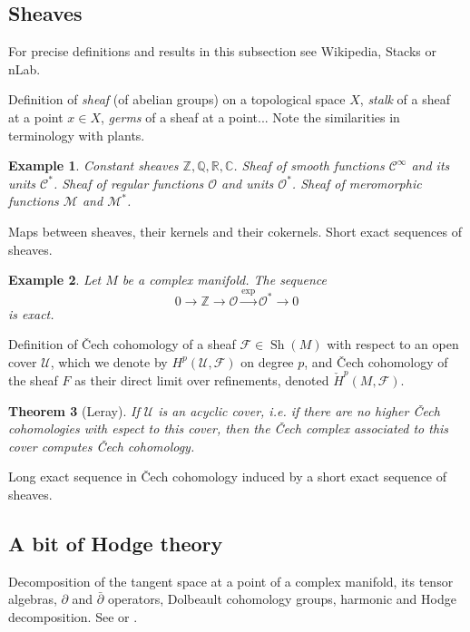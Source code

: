 \documentclass[12pt]{article}
\theoremstyle{darkgreentheorem}
\newtheorem{thm}{Theorem}[section]
\theoremstyle{darkbluedefinition}
\theoremstyle{darkredexample}
\newtheorem{exa}[thm]{Example}
\theoremstyle{remark}
\newcommand{\Z}{\mathbb{Z}}
\newcommand{\Q}{\mathbb{Q}}
\newcommand{\R}{\mathbb{R}}
\newcommand{\1}{\mathbbm{1}}
\newcommand{\C}{\mathbb{C}}
\newcommand{\calC}{\mathcal{C}}
\newcommand{\F}{\mathcal{F}}
\newcommand{\M}{\mathcal{M}}
\renewcommand{\O}{\mathcal{O}}
\newcommand{\U}{\mathcal{U}}
\DeclareMathOperator{\Sh}{Sh}
\begin{document}
\subsection{Sheaves}

For precise definitions and results in this subsection see Wikipedia, Stacks or nLab.

Definition of \textit{sheaf} (of abelian groups) on a topological space $X$, \textit{stalk} of a sheaf at a point $x\in X$, \textit{germs} of a sheaf at a point... Note the similarities in terminology with plants.

\begin{exa}
    Constant sheaves $\Z,\Q,\R,\C$.
    Sheaf of smooth functions $\calC^{\infty}$ and its units $\calC^{*}$.
    Sheaf of regular functions $\O$ and units $\O^{*}$.
    Sheaf of meromorphic functions $\M$ and $\M^{*}$.
\end{exa}

Maps between sheaves, their kernels and their cokernels.
Short exact sequences of sheaves.

\begin{exa}
    Let $M$ be a complex manifold.
    The sequence
    \[ 0\to \Z\to \O\xrightarrow{\exp} \O^{*}\to 0 \]
    is exact.
\end{exa}

Definition of \v{C}ech cohomology of a sheaf $\F\in \Sh(M)$ with respect to an open cover $\U$, which we denote by $H^{p}(\U,\F)$ on degree $p$, and \v{C}ech cohomology of the sheaf $F$ as their direct limit over refinements, denoted $\check{H}^{p}(M,\F)$.

\begin{thm}[Leray]
    If $\U$ is an acyclic cover, i.e. if there are no higher \v{C}ech cohomologies with espect to this cover, then the \v{C}ech complex associated to this cover computes \v{C}ech cohomology.
\end{thm}

Long exact sequence in \v{C}ech cohomology induced by a short exact sequence of sheaves.

\subsection{A bit of Hodge theory}

Decomposition of the tangent space at a point of a complex manifold, its tensor algebras, $\partial $ and $\bar{\partial }$ operators, Dolbeault cohomology groups, harmonic and Hodge decomposition.
See \cite{gh78} or \cite{voi07}.
\end{document}
